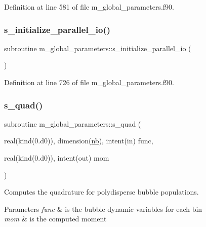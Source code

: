 Definition at line 581 of file m\+\_\+global\+\_\+parameters.\+f90.

\mbox{\label{namespacem__global__parameters_a54905a7a2ce9e15fc33ebac52c0d3c27}} 
\subsubsection{\texorpdfstring{s\+\_\+initialize\+\_\+parallel\+\_\+io()}{s\_initialize\_parallel\_io()}}
{\footnotesize\ttfamily subroutine m\+\_\+global\+\_\+parameters\+::s\+\_\+initialize\+\_\+parallel\+\_\+io (\begin{DoxyParamCaption}{ }\end{DoxyParamCaption})}



Definition at line 726 of file m\+\_\+global\+\_\+parameters.\+f90.

\mbox{\label{namespacem__global__parameters_aa5a48fa9cc196136634022cfa6708213}} 
\subsubsection{\texorpdfstring{s\+\_\+quad()}{s\_quad()}}
{\footnotesize\ttfamily subroutine m\+\_\+global\+\_\+parameters\+::s\+\_\+quad (\begin{DoxyParamCaption}\item[{real(kind(0.d0)), dimension(\hyperlink{namespacem__global__parameters_ad76c4758994b52559f478d251dc0cba5}{nb}), intent(in)}]{func,  }\item[{real(kind(0.d0)), intent(out)}]{mom }\end{DoxyParamCaption})}



Computes the quadrature for polydisperse bubble populations. 


\begin{DoxyParams}{Parameters}
{\em func} & is the bubble dynamic variables for each bin \\
\hline
{\em mom} & is the computed moment \\
\hline
\end{DoxyParams}


